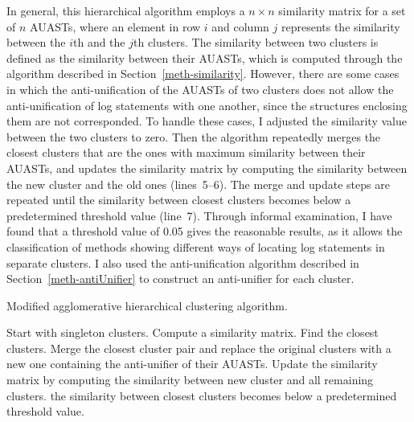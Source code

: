In general, this hierarchical algorithm employs a $n \times n$ similarity matrix for a set of $n$ AUASTs, where an element in row $i$ and column $j$ represents the similarity between the $i$th and the $j$th clusters. The similarity between two clusters is defined as the similarity between their AUASTs, which is computed through the algorithm described in Section~\ref{meth-similarity}. However, there are some cases in which the anti-unification of the AUASTs of two clusters does not allow the anti-unification of log statements with one another, since the structures enclosing them are not corresponded. To handle these cases, I adjusted the similarity value between the two clusters to zero. Then the algorithm repeatedly merges the closest clusters that are the ones with maximum similarity between their AUASTs, and updates the similarity matrix by computing the similarity between the new cluster and the old ones (lines~5--6). The merge and update steps are repeated until the similarity between closest clusters becomes below a predetermined threshold value (line~7). Through informal examination, I have found that a threshold value of 0.05 gives the reasonable results, as it allows the classification of methods showing different ways of locating log statements in separate clusters. I also used the anti-unification algorithm described in Section~\ref{meth-antiUnifier} to construct an anti-unifier for each cluster.



\begin{algorithm}
\caption{Modified agglomerative hierarchical clustering algorithm.} \label{modified-agglomerative}
\begin{algorithmic}[1]
\State Start with singleton clusters.
\State Compute a similarity matrix.
\Repeat
\State Find the closest clusters.
\State Merge the closest cluster pair and replace the original clusters with a new one containing the anti-unifier of their AUASTs.
\State Update the similarity matrix by computing the similarity between new cluster and all remaining clusters.
\Until the similarity between closest clusters becomes below a predetermined threshold value.
\end{algorithmic}
\end{algorithm}


